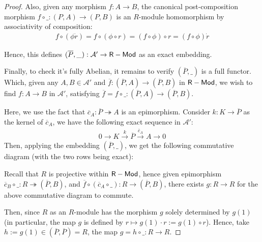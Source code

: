 \documentclass{article}
\begin{document}
\begin{proof}
    Also, given any morphism $f:A\rightarrow B$, the canonical post-composition morphism $f\circ\_:(P,A)\rightarrow (P,B)$ is an $R$-module homomorphism by associativity of composition:
    \begin{align}
        f \circ (\phi\dot r) = f\circ (\phi\circ r)=(f\circ \phi)\circ r = (f\circ \phi)\dot r
    \end{align}
    
    Hence, this defines $(\overline{P},\_):\mathcal{A}'\rightarrow\mathsf{R-Mod}$ as an exact embedding.

    \hfil

    Finally, to check it's fully Abelian, it remains to verify $(\overline{P},\_)$ is a full functor. Which, given any $A,B\in\mathcal{A}'$ and $\overline{f}:(\overline{P},A)\rightarrow (\overline{P},B)$ in $\mathsf{R-Mod}$, we wish to find $f:A\rightarrow B$ in $\mathcal{A}'$, satisfying $\overline{f}=f\circ\_:(\overline{P},A)\rightarrow(\overline{P},B)$.

    Here, we use the fact that $\overline{c}_A:\overline{P}\twoheadrightarrow A$ is an epimorphism. Consider $k:K\rightarrow \overline{P}$ as the kernel of $\overline{c}_A$, we have the following exact sequence in $\mathcal{A}'$:
    \begin{align}
        0\rightarrow K\xrightarrow{k} \overline{P}\xrightarrow{\overline{c}_A}A\rightarrow 0
    \end{align}
    Then, applying the embedding $(\overline{P},\_)$, we get the following commutative diagram (with the two rows being exact):
    \begin{center}
    \end{center}
    Recall that $R$ is projective within $\mathsf{R-Mod}$, hence given epimorphism $\overline{c}_B\circ\_:R\twoheadrightarrow (\overline{P},B)$, and $\overline{f}\circ (\overline{c}_A\circ\_):R\rightarrow (\overline{P},B)$, there exists $g:R\rightarrow R$ for the above commutative diagram to commute.

    Then, since $R$ as an $R$-module has the morphism $g$ solely determined by $g(1)$ (in particular, the map $g$ is defined by $r \mapsto g(1) \cdot r := g(1)\circ r$). Hence, take $h := g(1)\in (\overline{P},\overline{P})=R$, the map $g = h\circ \_:R\rightarrow R$.


\end{proof}
\end{document}
